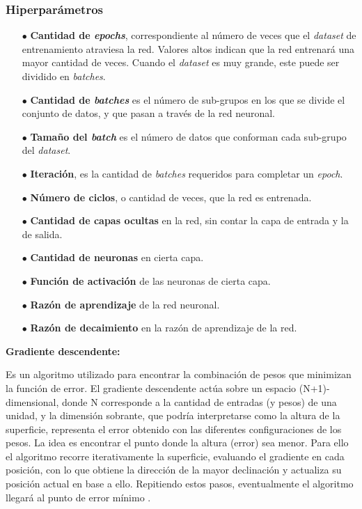 \subsubsection{Hiperparámetros}

\begin{itemize}
    \item[$\bullet$] \textbf{Cantidad de \emph{epochs}}, correspondiente al número de veces que el \emph{dataset} de entrenamiento atraviesa la red. Valores altos indican que la red entrenará una mayor cantidad de veces. Cuando el \emph{dataset} es muy grande, este puede ser dividido en \emph{batches}.
    \item[$\bullet$] \textbf{Cantidad de \emph{batches}} es el número de sub-grupos en los que se divide el conjunto de datos, y que pasan a través de la red neuronal.
    \item[$\bullet$] \textbf{Tamaño del \emph{batch}} es el número de datos que conforman cada sub-grupo del \emph{dataset}.
    \item[$\bullet$] \textbf{Iteración}, es la cantidad de \emph{batches} requeridos para completar un \emph{epoch}.
    \item[$\bullet$] \textbf{Número de ciclos}, o cantidad de veces, que la red es entrenada.
    \item[$\bullet$] \textbf{Cantidad de capas ocultas} en la red, sin contar la capa de entrada y la de salida.
    \item[$\bullet$] \textbf{Cantidad de neuronas} en cierta capa.
    \item[$\bullet$] \textbf{Función de activación} de las neuronas de cierta capa.
    \item[$\bullet$] \textbf{Razón de aprendizaje} de la red neuronal.
    \item[$\bullet$] \textbf{Razón de decaimiento} en la razón de aprendizaje de la red.
\end{itemize}

\textbf{Gradiente descendente:}

Es un algoritmo utilizado para encontrar la combinación de pesos que minimizan la función de error. El gradiente descendente actúa sobre un espacio (N+1)-dimensional, donde N corresponde a la cantidad de entradas (y pesos) de una unidad, y la dimensión sobrante, que podría interpretarse como la altura de la superficie, representa el error obtenido con las diferentes configuraciones de los pesos. La idea es encontrar el punto donde la altura (error) sea menor. Para ello el algoritmo recorre iterativamente la superficie, evaluando el gradiente en cada posición, con lo que obtiene la dirección de la mayor declinación y actualiza su posición actual en base a ello. Repitiendo estos pasos, eventualmente el algoritmo llegará al punto de error mínimo \cite{Buduma}.

